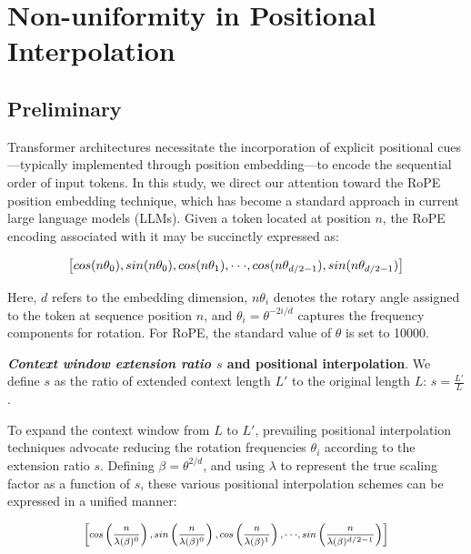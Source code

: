 \section{Non-uniformity in Positional Interpolation}
\label{sec:analysis}

\subsection{Preliminary}

Transformer architectures necessitate the incorporation of explicit positional cues—typically implemented through position embedding—to encode the sequential order of input tokens. In this study, we direct our attention toward the RoPE~\cite{rope} position embedding technique, which has become a standard approach in current large language models (LLMs). Given a token located at position $n$, the RoPE encoding associated with it may be succinctly expressed as:

\begin{equation}
		\fontsize{7.8}{7.8} \selectfont
	\label{eq:rope}
	\left[ cos(n\theta_0), sin(n\theta_0), cos(n\theta_1), \cdot\cdot\cdot, cos(n\theta_{d/2-1}), sin(n\theta_{d/2-1}) \right]   
\end{equation}

Here, $d$ refers to the embedding dimension, 
 $n\theta_i$ denotes the rotary angle assigned to the token at sequence position $n$, and 
$\theta_i = \theta^{-2i/d}$ captures the frequency components for rotation. For RoPE, the standard value of $\theta$ is set to 10000.

\textbf{\emph{Context window extension ratio $s$} and positional interpolation}. We define $s$ as  the ratio of extended context length $L'$ to the original length $L$: $s=\frac{L'}{L}$. 

To expand the context window from $L$ to $L'$, prevailing positional interpolation techniques advocate reducing the rotation frequencies $\theta_i$ according to the extension ratio $s$. Defining $\beta=\theta^{2/d}$, and using $\lambda$ to represent the true scaling factor as a function of $s$, these various positional interpolation schemes can be expressed in a unified manner:

\begin{equation}	
	\fontsize{7.5}{7.5} \selectfont
	\label{eq:unified_rope}
	\begin{aligned}
		\left[cos\left(\frac{n}{\lambda(\beta)^0}\right), sin \left(\frac{n}{\lambda(\beta)^0}\right), cos\left(\frac{n}{\lambda(\beta)^1}\right), \cdot\cdot\cdot,  sin \left(\frac{n}{\lambda(\beta)^{d/2-1}}\right) \right]   
	\end{aligned}
\end{equation}

